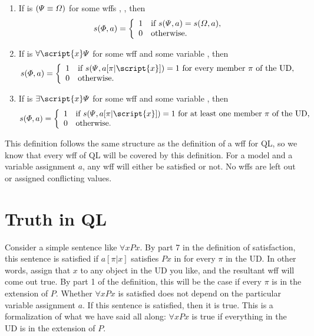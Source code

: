 \begin{enumerate}
\item If \metaA{} is $(\varPsi{}\equiv\varOmega{})$ for some wffs \metaA{}, \metaB{}, then
\begin{displaymath}s(\varPhi{}, a) =
	\left\{\begin{array}{ll}
	1 & \mbox{if $s(\varPsi{}, a) = s(\varOmega{}, a)$},\\
	0 & \mbox{otherwise.}
	\end{array}\right.
\end{displaymath}

\item If \metaA{} is $\forall\script{x} \metaB{}$ for some wff \metaB{} and some variable , then
\begin{displaymath}s(\metaA{}, a) =
	\left\{\begin{array}{ll}
	1 & \mbox{if $s(\metaB{}, a[\pi|\script{x}])=1$ for every member $\pi$ of the UD},\\
	0 & \mbox{otherwise.}
	\end{array}\right.
\end{displaymath}

\item If \metaA{} is $\exists\script{x} \metaB{}$ for some wff \metaB{} and some variable , then
\begin{displaymath}s(\metaA{}, a) =
	\left\{\begin{array}{ll}
	1 & \mbox{if $s(\metaB{}, a[\pi|\script{x}])=1$ for at least one member $\pi$ of the UD},\\
	0 & \mbox{otherwise.}
	\end{array}\right.
\end{displaymath}
\end{enumerate}
 
This definition follows the same structure as the definition of a wff for QL, so we know that every wff of QL will be covered by this definition. For a model  and a variable assignment $a$, any wff will either be satisfied or not. No wffs are left out or assigned conflicting values.




\section{Truth in QL}

Consider a simple sentence like $\forall xPx$. By part 7 in the definition of satisfaction, this sentence is satisfied if $a[\pi|x]$ satisfies $Px$ in  for every $\pi$ in the UD. In other words, assign that $x$ to any object in the UD you like, and the resultant wff will come out true. By part 1 of the definition, this will be the case if every $\pi$ is in the extension of $P$. Whether $\forall xPx$ is satisfied does not depend on the particular variable assignment $a$. If this sentence is satisfied, then it is true. This is a formalization of what we have said all along: $\forall xPx$ is true if everything in the UD is in the extension of $P$.

